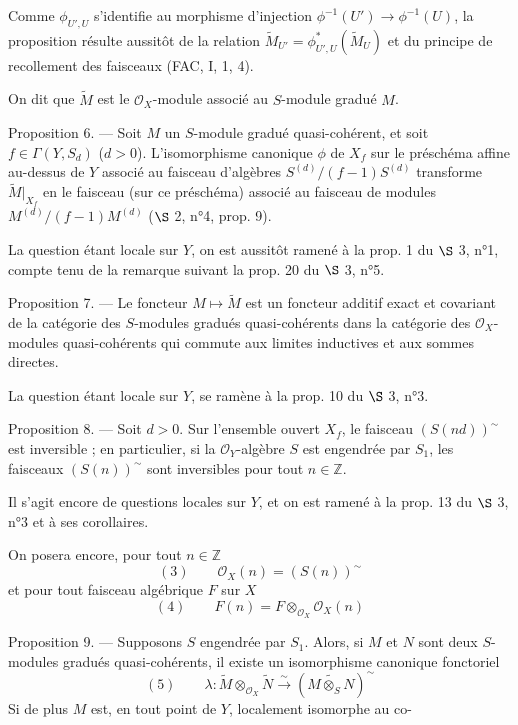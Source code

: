 Comme $\phi_{U', U}$ s'identifie au morphisme d'injection $\phi^{-1}(U') \to \phi^{-1}(U)$, la proposition résulte aussitôt de la relation $\widetilde{M}_{U'} = \phi_{U', U}^*(\widetilde{M}_U)$ et du principe de recollement des faisceaux (FAC, I, 1, 4).

\newpage


On dit que $\widetilde{M}$ est le $\mathcal{O}_X$-module associé au $S$-module gradué $M$.

Proposition 6. — Soit $M$ un $S$-module gradué quasi-cohérent, et soit $f \in \Gamma(Y, S_d)$ ($d > 0$). L'isomorphisme canonique $\phi$ de $X_f$ sur le préschéma affine au-dessus de $Y$ associé au faisceau d'algèbres $S^{(d)} / (f-1)S^{(d)}$ transforme $\widetilde{M}|_{X_f}$ en le faisceau (sur ce préschéma) associé au faisceau de modules $M^{(d)} / (f-1)M^{(d)}$ ($\S$ 2, n°4, prop. 9).

La question étant locale sur $Y$, on est aussitôt ramené à la prop. 1 du $\S$ 3, n°1, compte tenu de la remarque suivant la prop. 20 du $\S$ 3, n°5.

Proposition 7. — Le foncteur $M \mapsto \widetilde{M}$ est un foncteur additif exact et covariant de la catégorie des $S$-modules gradués quasi-cohérents dans la catégorie des $\mathcal{O}_X$-modules quasi-cohérents qui commute aux limites inductives et aux sommes directes.

La question étant locale sur $Y$, se ramène à la prop. 10 du $\S$ 3, n°3.

Proposition 8. — Soit $d > 0$. Sur l'ensemble ouvert $X_f$, le faisceau $(S(nd))^{\sim}$ est inversible ; en particulier, si la $\mathcal{O}_Y$-algèbre $S$ est engendrée par $S_1$, les faisceaux $(S(n))^{\sim}$ sont inversibles pour tout $n \in \mathbb{Z}$.

Il s'agit encore de questions locales sur $Y$, et on est ramené à la prop. 13 du $\S$ 3, n°3 et à ses corollaires.

On posera encore, pour tout $n \in \mathbb{Z}$
$$(3) \qquad \mathcal{O}_X(n) = (S(n))^{\sim}$$
et pour tout faisceau algébrique $F$ sur $X$
$$(4) \qquad F(n) = F \otimes_{\mathcal{O}_X} \mathcal{O}_X(n)$$

Proposition 9. — Supposons $S$ engendrée par $S_1$. Alors, si $M$ et $N$ sont deux $S$-modules gradués quasi-cohérents, il existe un isomorphisme canonique fonctoriel
$$(5) \qquad \lambda : \widetilde{M} \otimes_{\mathcal{O}_X} \widetilde{N} \xrightarrow{\sim} (\widetilde{M \otimes_S N})^{\sim}$$
Si de plus $M$ est, en tout point de $Y$, localement isomorphe au co-

